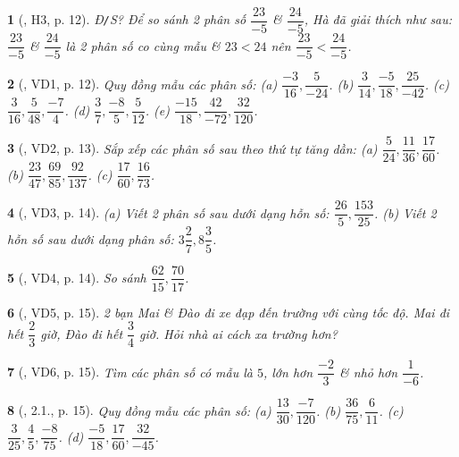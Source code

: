 \documentclass{article}
\newtheorem{baitoan}{}
\begin{document}
\begin{baitoan}[\cite{Binh_boi_duong_Toan_6_tap_2}, H3, p. 12]
	{\rm Đ{\tt/}S?} Để so sánh 2 phân số $\dfrac{23}{-5}$ \&  $\dfrac{24}{-5}$, Hà đã giải thích như sau: $\dfrac{23}{-5}$ \&  $\dfrac{24}{-5}$ là 2 phân số co cùng mẫu \& $23 < 24$ nên $\dfrac{23}{-5} < \dfrac{24}{-5}$.
\end{baitoan}

\begin{baitoan}[\cite{Binh_boi_duong_Toan_6_tap_2}, VD1, p. 12]
	Quy đồng mẫu các phân số: (a) $\dfrac{-3}{16},\dfrac{5}{-24}$. (b) $\dfrac{3}{14},\dfrac{-5}{18},\dfrac{25}{-42}$. (c) $\dfrac{3}{16},\dfrac{5}{48},\dfrac{-7}{4}$. (d) $\dfrac{3}{7},\dfrac{-8}{5},\dfrac{5}{12}$. (e) $\dfrac{-15}{18},\dfrac{42}{-72},\dfrac{32}{120}$.
\end{baitoan}

\begin{baitoan}[\cite{Binh_boi_duong_Toan_6_tap_2}, VD2, p. 13]
	Sắp xếp các phân số sau theo thứ tự tăng dần: (a) $\dfrac{5}{24},\dfrac{11}{36},\dfrac{17}{60}$. (b) $\dfrac{23}{47},\dfrac{69}{85},\dfrac{92}{137}$. (c) $\dfrac{17}{60},\dfrac{16}{73}$.
\end{baitoan}

\begin{baitoan}[\cite{Binh_boi_duong_Toan_6_tap_2}, VD3, p. 14]
	(a) Viết 2 phân số sau dưới dạng hỗn số: $\dfrac{26}{5},\dfrac{153}{25}$. (b) Viết 2 hỗn số sau dưới dạng phân số: $3\dfrac{2}{7},8\dfrac{3}{5}$.
\end{baitoan}

\begin{baitoan}[\cite{Binh_boi_duong_Toan_6_tap_2}, VD4, p. 14]
	So sánh $\dfrac{62}{15},\dfrac{70}{17}$.
\end{baitoan}

\begin{baitoan}[\cite{Binh_boi_duong_Toan_6_tap_2}, VD5, p. 15]
	2 bạn Mai \& Đào đi xe đạp đến trường với cùng tốc độ. Mai đi hết $\dfrac{2}{3}$ giờ, Đào đi hết $\dfrac{3}{4}$ giờ. Hỏi nhà ai cách xa trường hơn?
\end{baitoan}

\begin{baitoan}[\cite{Binh_boi_duong_Toan_6_tap_2}, VD6, p. 15]
	Tìm các phân số có mẫu là $5$, lớn hơn $\dfrac{-2}{3}$ \& nhỏ hơn $\dfrac{1}{-6}$.
\end{baitoan}

\begin{baitoan}[\cite{Binh_boi_duong_Toan_6_tap_2}, 2.1., p. 15]
	Quy đồng mẫu các phân số: (a) $\dfrac{13}{30},\dfrac{-7}{120}$. (b) $\dfrac{36}{75},\dfrac{6}{11}$. (c) $\dfrac{3}{25},\dfrac{4}{5},\dfrac{-8}{75}$. (d) $\dfrac{-5}{18},\dfrac{17}{60},\dfrac{32}{-45}$.
\end{baitoan}
\end{document}
